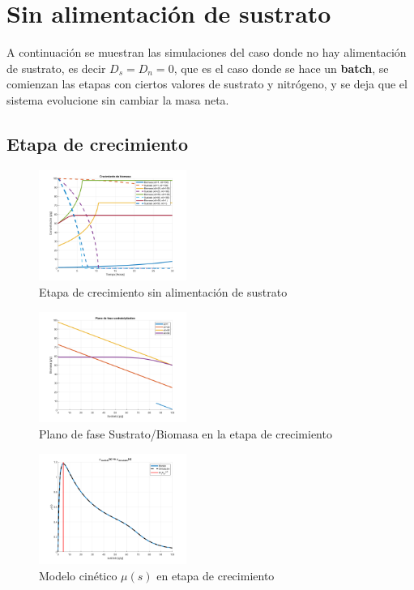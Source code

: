 \documentclass[letterpaper, 10 pt, conference]{ieeeconf}  %
\begin{document}
\section{Sin alimentación de sustrato}

A continuación se muestran las simulaciones del caso donde no hay alimentación de sustrato, es decir $D_{s}=D_{n}=0$, que es el caso donde se hace un \textbf{batch}, se comienzan las etapas con ciertos valores de sustrato y nitrógeno, y se deja que el sistema evolucione sin cambiar la masa neta.

\subsection{Etapa de crecimiento}

\begin{figure}[H]
  \centering
  \includegraphics[width=0.43\textwidth]{./Images_tp1/D0_crecimiento_completo.png}
  \caption{Etapa de crecimiento sin alimentación de sustrato}
  \label{fig:D0_whole}
\end{figure}

\begin{figure}[H]
  \centering
  \includegraphics[width=0.43\textwidth]{./Images_tp1/D0_plano_fase.png}
  \caption{Plano de fase Sustrato/Biomasa en la etapa de crecimiento}
  \label{fig:D0_fase}
\end{figure}

\begin{figure}[H]
  \centering
  \includegraphics[width=0.43\textwidth]{./Images_tp1/D0_mus.png}
  \caption{Modelo cinético $\mu(s)$ en etapa de crecimiento}
  \label{fig:D0_mu}
\end{figure}
\end{document}

